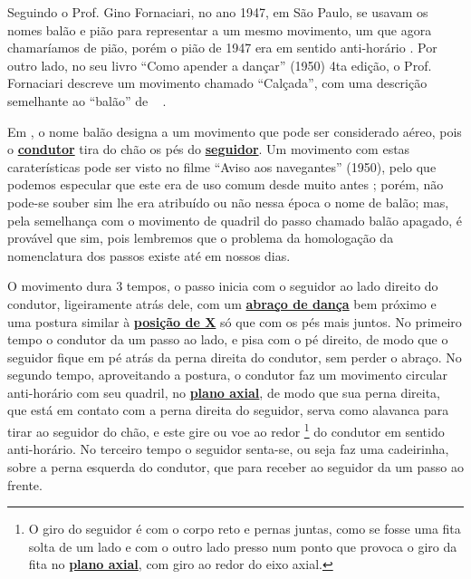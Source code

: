 Seguindo o Prof. Gino Fornaciari, no ano 1947,  em São Paulo, se usavam os nomes balão e pião
para representar a um mesmo movimento, um que agora chamaríamos de pião, 
porém o pião de 1947 era em sentido anti-horário \cite[pp. 68-72]{fornaciari1947aprender}.
Por outro lado, no seu livro ``Como apender a dançar'' (1950) 4ta edição,
o Prof. Fornaciari descreve um movimento  chamado ``Calçada'', com uma descrição semelhante 
ao ``balão'' de \AnoLivro~ \cite[pp. 162]{fornaciari1950aprender}.

Em \AnoLivro, o nome balão designa a um movimento que pode ser considerado aéreo, 
pois o \hyperref[def:Condutor]{\textbf{condutor}} tira do chão os pés do \hyperref[def:Seguidor]{\textbf{seguidor}}.
Um movimento com estas caraterísticas pode ser visto no filme ``Aviso aos navegantes'' (1950),
pelo que podemos especular que este era de uso comum desde muito antes \cite[min. 40:35]{AtlantidaDance};
porém, não pode-se souber sim lhe era atribuído ou não nessa época o nome de balão; 
mas, pela semelhança com o movimento de quadril do passo chamado balão apagado,
é provável que sim, 
pois lembremos que o problema da homologação da nomenclatura dos passos existe até em  nossos dias.



O movimento dura 3 tempos, o passo inicia com o seguidor ao lado direito do condutor, 
ligeiramente atrás dele, com um \hyperref[def:abracodedanca]{\textbf{abraço de dança}} 
bem próximo e uma postura similar à \hyperref[def:X-position]{\textbf{posição de X}} só que com os pés mais juntos.
No primeiro tempo o condutor da um passo ao lado, e pisa com o pé direito,
de modo que o seguidor fique em pé atrás da perna direita do condutor, sem perder o abraço.
No segundo tempo, aproveitando a postura, 
o condutor faz um movimento circular anti-horário com seu quadril, no \hyperref[def:PlanoAxial]{\textbf{plano axial}},
de modo que sua perna direita, que está em contato com a perna direita do seguidor,
serva como alavanca para tirar ao seguidor do chão, 
e este gire ou voe ao redor \footnote{O giro do seguidor é com o corpo reto e pernas juntas, 
como se fosse uma fita solta de um lado e com o outro lado presso num ponto 
que provoca o giro da fita no \hyperref[def:PlanoAxial]{\textbf{plano axial}}, com giro ao redor do eixo axial.} 
do condutor em sentido anti-horário.
No terceiro tempo o seguidor senta-se, ou seja faz uma cadeirinha, sobre a perna esquerda do condutor,
que para receber ao seguidor  da um passo ao frente.

